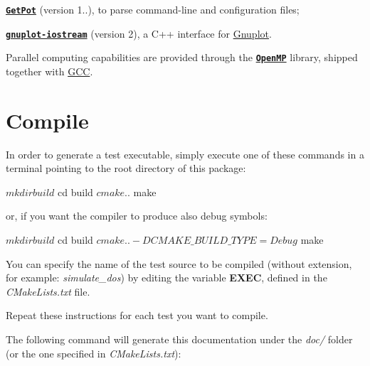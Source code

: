 \begin{DoxyItemize}
\item \href{http://getpot.sourceforge.net}{\tt {\bfseries Get\-Pot}} (version 1..), to parse command-\/line and configuration files; \item \label{index_gnuplot-iostream}%
\hypertarget{index_gnuplot-iostream}{}%
\href{http://www.stahlke.org/dan/gnuplot-iostream}{\tt {\bfseries gnuplot-\/iostream}} (version 2), a C++ interface for \hyperlink{index_Gnuplot}{Gnuplot}.\end{DoxyItemize}
Parallel computing capabilities are provided through the \href{http://openmp.org}{\tt {\bfseries Open\-M\-P}} library, shipped together with \hyperlink{index_GCC}{G\-C\-C}.\hypertarget{index_install_sec}{}\section{Compile}\label{index_install_sec}
In order to generate a test executable, simply execute one of these commands in a terminal pointing to the root directory of this package\-:


\begin{DoxyCode}
$ mkdir build
$ cd build
$ cmake ..
$ make
\end{DoxyCode}


or, if you want the compiler to produce also debug symbols\-:


\begin{DoxyCode}
$ mkdir build
$ cd build
$ cmake .. -DCMAKE\_BUILD\_TYPE=Debug
$ make
\end{DoxyCode}


You can specify the name of the test source to be compiled (without extension, for example\-: {\itshape simulate\-\_\-dos}) by editing the variable {\bfseries E\-X\-E\-C}, defined in the {\itshape C\-Make\-Lists.\-txt} file.

Repeat these instructions for each test you want to compile.

The following command will generate this documentation under the {\itshape doc/} folder (or the one specified in {\itshape C\-Make\-Lists.\-txt})\-:



